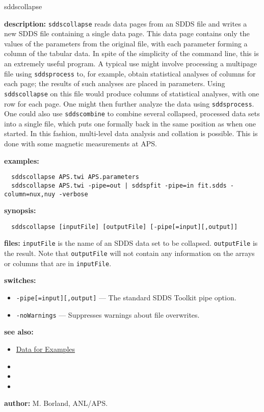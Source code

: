 \begin{sddsprog}{sddscollapse}
  \item {\bf description:} \verb|sddscollapse| reads data pages from an SDDS file and writes a new SDDS file containing a single data page. This data page contains only the values of the parameters from the original file, with each parameter forming a column of the tabular data. In spite of the simplicity of the command line, this is an extremely useful program. A typical use might involve processing a multipage file using \verb|sddsprocess| to, for example, obtain statistical analyses of columns for each page; the results of such analyses are placed in parameters. Using \verb|sddscollapse| on this file would produce columns of statistical analyses, with one row for each page. One might then further analyze the data using \verb|sddsprocess|. One could also use \verb|sddscombine| to combine several collapsed, processed data sets into a single file, which puts one formally back in the same position as when one started. In this fashion, multi-level data analysis and collation is possible. This is done with some magnetic measurements at APS.

  \item {\bf examples:}
  \begin{verbatim}
  sddscollapse APS.twi APS.parameters
  sddscollapse APS.twi -pipe=out | sddspfit -pipe=in fit.sdds -column=nux,nuy -verbose
  \end{verbatim}

  \item {\bf synopsis:}
  \begin{verbatim}
  sddscollapse [inputFile] [outputFile] [-pipe[=input][,output]]
  \end{verbatim}

  \item {\bf files:} \verb|inputFile| is the name of an SDDS data set to be collapsed.  \verb|outputFile| is the result.  Note that \verb|outputFile| will not contain any information on the arrays or columns that are in \verb|inputFile|.

  \item {\bf switches:}
  \begin{itemize}
    \item \verb|-pipe[=input][,output]| --- The standard SDDS Toolkit pipe option.
    \item \verb|-noWarnings| --- Suppresses warnings about file overwrites.
  \end{itemize}

  \item {\bf see also:}
  \begin{itemize}
    \item \hyperref[exampleData]{Data for Examples}
    \item {}
    \item {}
    \item {}
  \end{itemize}

  \item {\bf author:} M. Borland, ANL/APS.
\end{sddsprog}


